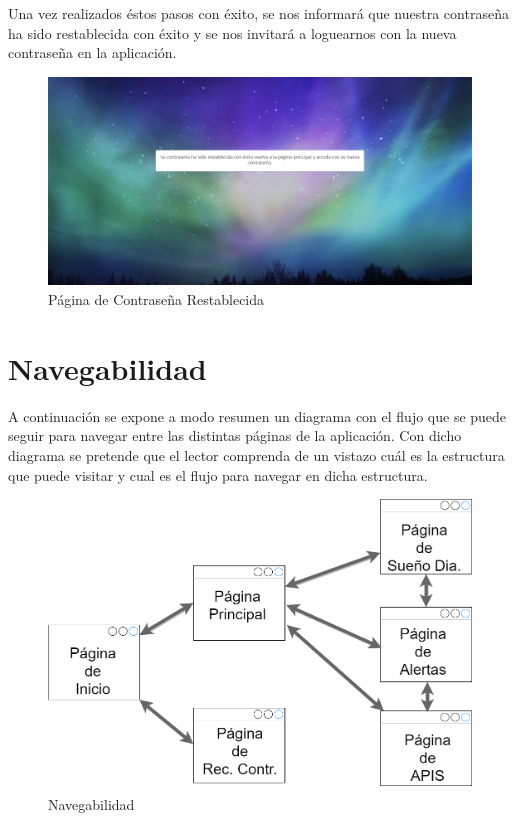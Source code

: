 \documentclass[11pt,openany]{book}
\begin{document}
\pagebreak
Una vez realizados éstos pasos con éxito, se nos informará que nuestra contraseña ha sido restablecida con éxito y se nos invitará a loguearnos con la nueva contraseña en la aplicación.

\begin{figure}[H]
\centering
\includegraphics[totalheight=6cm]{manualUsuario/contrase_aRestablecida.png}
\caption{Página de Contraseña Restablecida}
\end{figure}

\pagebreak
\section{Navegabilidad}

A continuación se expone a modo resumen un diagrama con el flujo que se puede seguir para navegar entre las distintas páginas de la aplicación. Con dicho diagrama se pretende que el lector comprenda de un vistazo cuál es la estructura que puede visitar y cual es el flujo para navegar en dicha estructura.

\begin{figure}[H]
\centering
\includegraphics[totalheight=8cm]{manualUsuario/Navegabilidad.png}
\caption{Navegabilidad}
\end{figure}
\end{document}
